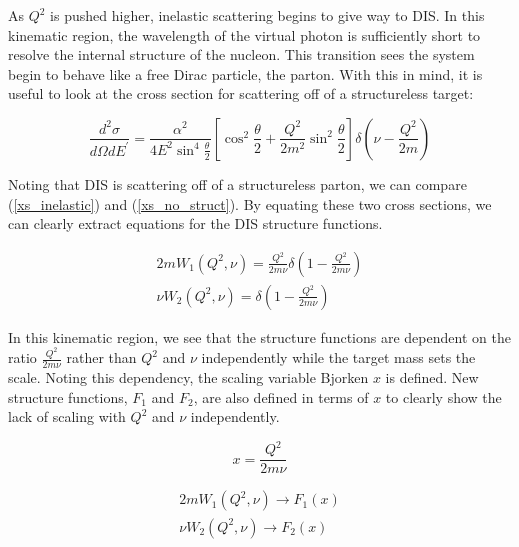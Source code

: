 As $Q^2$ is pushed higher, inelastic scattering begins to give way to DIS. In this kinematic region, the wavelength of the virtual photon is sufficiently short to resolve the internal structure of the nucleon. This transition sees the system begin to behave like a free Dirac particle, the parton. With this in mind, it is useful to look at the cross section for scattering off of a structureless target:

\begin{equation}
	\frac{d^2\sigma}{d\Omega dE^\prime} = \frac{\alpha^2}{4E^{2}\sin^{4}\frac{\theta}{2}} \left[\cos^{2}\frac{\theta}{2} + \frac{Q^2}{2m^2}\sin^{2}\frac{\theta}{2}\right] \delta\left(\nu-\frac{Q^2}{2m}\right)
	\label{xs_no_struct}
\end{equation}

Noting that DIS is scattering off of a structureless parton, we can compare (\ref{xs_inelastic}) and (\ref{xs_no_struct}). By equating these two cross sections, we can clearly extract equations for the DIS structure functions.

\begin{subequations}
\begin{align}
	2mW_1\left(Q^{2},\nu\right) = \frac{Q^2}{2m\nu}\delta\left(1-\frac{Q^2}{2m\nu}\right) \\
	\nu W_2\left(Q^{2},\nu\right) = \delta\left(1-\frac{Q^2}{2m\nu}\right)
\end{align}
\end{subequations}

In this kinematic region, we see that the structure functions are dependent on the ratio $\frac{Q^2}{2m\nu}$ rather than $Q^2$ and $\nu$ independently while the target mass sets the scale. Noting this dependency, the scaling variable Bjorken $x$ is defined. New structure functions, $F_1$ and $F_2$, are also defined in terms of $x$ to clearly show the lack of scaling with $Q^2$ and $\nu$ independently.

\begin{equation}
	x = \frac{Q^2}{2m\nu}
\end{equation}

\begin{subequations}
\begin{align}
	2mW_1\left(Q^{2},\nu\right) \rightarrow F_{1}\left(x\right) \\
	\nu W_2\left(Q^{2},\nu\right) \rightarrow F_{2}\left(x\right)
\end{align}
\end{subequations}

